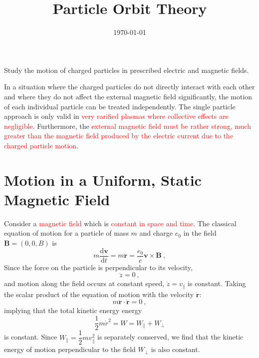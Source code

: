 \documentclass[12pt,a4paper]{article}
\title{Particle Orbit Theory}
\author{}
\date{\today}
\renewcommand{\vec}[1]{\boldsymbol{#1}}
\newcommand{\dif}{\mathrm{d}}
\begin{document}
\maketitle
\cite{1996bspp.book.....B}  Study the motion of charged particles in prescribed electric and magnetic fields.

In a situation where the charged particles do not directly interact with each other and where they do not affect the external magnetic field significantly, the motion of each individual particle can be treated independently. The single particle approach is only valid in \textcolor{red}{very rarified plasmas where collective effects are negligible}. Furthermore, the \textcolor{red}{external magnetic field must be rather strong, much greater than the magnetic field produced by the electric current due to the charged particle motion}.


\section{Motion in a Uniform, Static Magnetic Field}
\cite{2015bps..book.....C} Consider a \textcolor{red}{magnetic field} which is \textcolor{red}{constant in space and time}. The classical equation of motion for a particle of mass $m$ and charge $e_0$ in the field $\vec{B} = (0, 0, B)$ is
\begin{equation}
m\frac{\dif \vec{v}}{\dif t} = m \vec{\ddot{r}} = \frac{e_0}{c} \vec{v} \times \vec{B} ~,
\end{equation}
Since the force on the particle is perpendicular to its velocity,
\begin{equation*}
\ddot{z} = 0 ~,
\end{equation*}
and motion along the field occurs at constant speed, $\dot{z} = v_\parallel$ is constant. Taking the scalar product of the equation of motion with the velocity $\vec{\dot{r}}$:
\begin{equation*}
m\vec{\ddot{r}} \cdot \vec{\dot{r}} = 0 ~,
\end{equation*}
implying that the total kinetic energy energy
\begin{equation*}
\frac{1}{2} m \dot{r}^2 = W = W_\parallel +W_\perp
\end{equation*}
is constant. Since $W_\parallel = \dfrac{1}{2} mv_\parallel^2$ is separately conserved, we find that the kinetic energy of motion perpendicular to the field $W_\perp$ is also constant.
\end{document}
